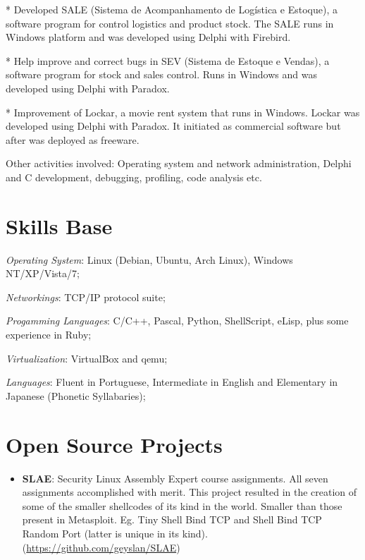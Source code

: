 \documentclass[margin]{res}
\begin{document}
\begin{resume}
      * Developed SALE (Sistema de Acompanhamento de Logística e Estoque), a software program for control logistics and
        product stock. The SALE runs in Windows platform and was developed using Delphi with Firebird.

      * Help improve and correct bugs in SEV (Sistema de Estoque e Vendas), a software program for stock and sales control.
        Runs in Windows and was developed using Delphi with Paradox.

      * Improvement of Lockar, a movie rent system that runs in Windows. Lockar was developed using Delphi with Paradox.
        It initiated as commercial software but after was deployed as freeware.

      Other activities involved: Operating system and network administration, Delphi and C development, debugging, profiling,
      code analysis etc.

\section{Skills Base} \textit{Operating System}: Linux (Debian, Ubuntu, Arch Linux), Windows NT/XP/Vista/7;

			\textit{Networkings}: TCP/IP protocol suite;

			\textit{Progamming Languages}: C/C++, Pascal, Python, ShellScript, eLisp, plus some experience in Ruby;

			\textit{Virtualization}: VirtualBox and qemu;

			\textit{Languages}: Fluent in Portuguese, Intermediate in English and Elementary in Japanese (Phonetic
                                            Syllabaries);

\section{Open Source Projects}
		\begin{itemize}
                    \item \textbf{SLAE}: Security Linux Assembly Expert course assignments. All seven assignments accomplished with
                                         merit. This project resulted in the creation of some of the smaller shellcodes of its kind
                                         in the world. Smaller than those present in Metasploit. Eg. Tiny Shell Bind TCP and Shell Bind
                                         TCP Random Port (latter is unique in its kind).\newline
                                         (\url{https://github.com/geyslan/SLAE})\vspace{1mm}


\end{itemize}
\end{resume}
\end{document}
